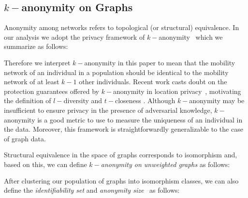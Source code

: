 \subsection{$k-$anonymity on Graphs\label{sec:graph-k-anonymity}}

Anonymity among networks refers to topological (or structural) equivalence. In our analysis we adopt the privacy framework of $k-$anonymity~\cite{sweeney2002k} which we summarize as follows:


\vspace{.4cm}
Therefore we interpret $k-$anonymity in this paper to mean that the mobility network of an individual in a population should be identical to the mobility network of at least $k-1$ other individuals.
Recent work casts doubt on the protection guarantees offered by \mbox{$k-$anonymity} in location privacy~\cite{shokri2010}, motivating the definition of $l-$diversity \cite{Machanavajjhala2007} and $t-$closeness \cite{li2007}.
Although $k-$anonymity may be insufficient to ensure privacy in the presence of adversarial knowledge, \mbox{$k-$anonymity} is a good metric to use to measure the uniqueness of an individual in the data.
Moreover, this framework is straightforwardly generalizable to the case of graph data.

Structural equivalence in the space of graphs corresponds to isomorphism and, based on this, we can define \emph{$k-$anonymity on unweighted graphs} as follows:



\vspace{.4cm}
After clustering our population of graphs into isomorphism classes, we can also define the \emph{identifiability set} and \emph{anonymity size}~\cite{anon_terminology} as follows:

